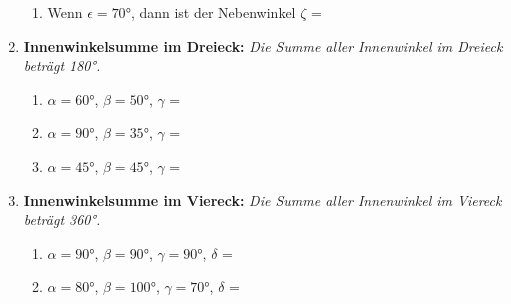 \begin{enumerate}[label=\arabic*.]
\begin{enumerate}[label=\alph*)]
        \item Wenn $\epsilon = 70°$, dann ist der Nebenwinkel $\zeta$ = \underline{\hspace{2cm}}
    \end{enumerate}

    \vspace{1cm}

    \item \textbf{Innenwinkelsumme im Dreieck:}
    \textit{Die Summe aller Innenwinkel im Dreieck beträgt 180°.}
    \vspace{0.5cm}

    \begin{enumerate}[label=\alph*)]
        \item $\alpha = 60°$, $\beta = 50°$, $\gamma$ = \underline{\hspace{2cm}}
        \vspace{0.5cm}

        \item $\alpha = 90°$, $\beta = 35°$, $\gamma$ = \underline{\hspace{2cm}}
        \vspace{0.5cm}

        \item $\alpha = 45°$, $\beta = 45°$, $\gamma$ = \underline{\hspace{2cm}}
    \end{enumerate}

    \vspace{1cm}

    \item \textbf{Innenwinkelsumme im Viereck:}
    \textit{Die Summe aller Innenwinkel im Viereck beträgt 360°.}
    \vspace{0.5cm}

    \begin{enumerate}[label=\alph*)]
        \item $\alpha = 90°$, $\beta = 90°$, $\gamma = 90°$, $\delta$ = \underline{\hspace{2cm}}
        \vspace{0.5cm}

        \item $\alpha = 80°$, $\beta = 100°$, $\gamma = 70°$, $\delta$ = \underline{\hspace{2cm}}
    \end{enumerate}

\end{enumerate}
